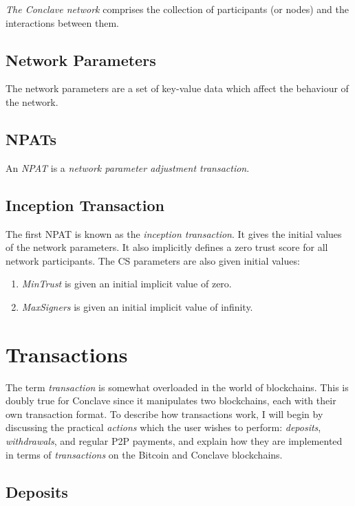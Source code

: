 \documentclass{article}
\begin{document}
\textit{The Conclave network} comprises the collection of participants (or nodes) and the interactions between them.

\subsection{Network Parameters}

The network parameters are a set of key-value data which affect the behaviour of the network.

\subsection{NPATs}

An \textit{NPAT} is a \textit{network parameter adjustment transaction}. 

\subsection{Inception Transaction}

The first NPAT is known as the \textit{inception transaction}. It gives the initial values of the network parameters. It also implicitly defines a zero trust score for all network participants. The CS parameters are also given initial values:

\begin{enumerate}
	\item \textit{MinTrust} is given an initial implicit value of zero.
	\item \textit{MaxSigners} is given an initial implicit value of infinity.
\end{enumerate}

\section{Transactions}

The term \textit{transaction} is somewhat overloaded in the world of blockchains. This is doubly true for Conclave since it manipulates two blockchains, each with their own transaction format. To describe how transactions work, I will begin by discussing the practical \textit{actions} which the user wishes to perform: \textit{deposits}, \textit{withdrawals}, and regular P2P payments, and explain how they are implemented in terms of \textit{transactions} on the Bitcoin and Conclave blockchains.

\subsection{Deposits}
\end{document}
